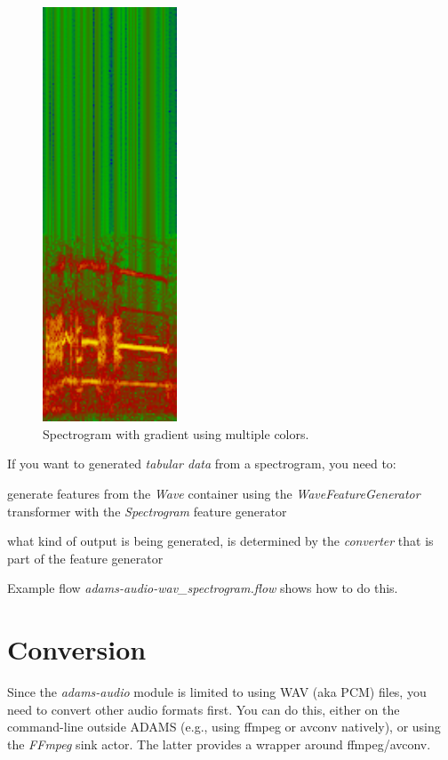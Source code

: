 \documentclass[a4paper]{book}
\begin{document}
\begin{figure}[htb]
  \centering
  \includegraphics[width=4.0cm]{images/spectrogram.png}
  \caption{Spectrogram with gradient using multiple colors.}
  \label{spectrogram}
\end{figure}

\clearpage
\noindent If you want to generated \textit{tabular data} from a spectrogram,
you need to:
\begin{tight_itemize}
  \item generate features from the \textit{Wave} container using the
  \textit{WaveFeatureGenerator} transformer with the \textit{Spectrogram}
  feature generator
  \item what kind of output is being generated, is determined by the
  \textit{converter} that is part of the feature generator
\end{tight_itemize}
Example flow \textit{adams-audio-wav\_spectrogram.flow} shows how to do this.

\chapter{Conversion}
Since the \textit{adams-audio} module is limited to using WAV (aka PCM) files,
you need to convert other audio formats first. You can do this, either on
the command-line outside ADAMS (e.g., using ffmpeg or avconv natively), or
using the \textit{FFmpeg} sink actor. The latter provides a wrapper around
ffmpeg/avconv\cite{ffmpeg}.
\end{document}

